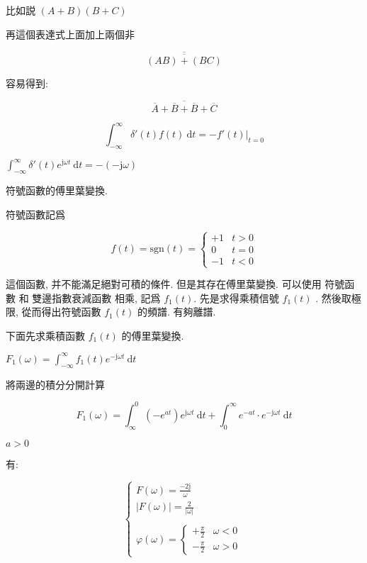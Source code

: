 \documentclass[a4paper, 10pt]{ctexbook} %
\begin{document}
比如説 $\left(A + B\right) \left(B +C\right)$

再這個表達式上面加上兩個非

$$ \overline{ \overline { \left(A  B \right) +\left( B  C\right)}}$$

容易得到: 

$$ \overline{ \overline{A}+  \overline{B} + \overline{B} + \overline{C}}$$

$$ \int  ^{\infty} _{-\infty} \delta ' \left(t\right) f(t) \ \mathrm{d}t   = - \left. f'\left(t\right) \right| _{t=0}$$

$\int ^{\infty} _{-\infty} \delta ' \left(t\right) e ^{\mathrm{j} \omega t }\ \mathrm{d}t = - \left( - \mathrm{j} \omega\right)$



符號函數的傅里葉變換. 

符號函數記爲 

$$f\left(t\right)  = \mathrm{sgn} \left(t\right) = \begin{cases} +1 & t > 0 \\ 0 & t= 0 \\ -1 & t<0 \end{cases} $$

這個函數, 并不能滿足絕對可積的條件. 但是其存在傅里葉變換. 可以使用 符號函數 和 雙邊指數衰減函數 相乘, 記爲 $f_{1} \left(t\right)$. 先是求得乘積信號 $f_1\left(t\right)$ . 然後取極限, 從而得出符號函數 $f_1 \left(t\right)$ 的頻譜. 有夠離譜. 

下面先求乘積函數 $f_{1} \left(t\right)$ 的傅里葉變換. 

$F_{1} \left(\omega\right) = \int ^{\infty}_{-\infty} f_{1} \left(t\right) e ^{-\mathrm{j} \omega t}\ \mathrm{d}t$

將兩邊的積分分開計算

$$F_1 \left(\omega\right) = \int ^{0} _{\infty} \left(-e^{at}\right) e ^{\mathrm{j} \omega   t   }\ \mathrm{d}t + \int ^{\infty}_{0} e ^{-at} \cdot  e ^{-\mathrm{j} \omega t}\ \mathrm{d}t$$

$a> 0$

有: 

$$ \begin{cases} \displaystyle  F \left(\omega\right) = \frac{ -2 \mathrm{j} }{\omega } \\ \displaystyle \left| F \left(\omega\right) \right|  = \frac{ 2 }{|\omega|}\\ \\ \displaystyle  \varphi  \left( \omega\right) = \begin{cases} \displaystyle + \frac{\pi}{2}  & \omega < 0 \\ \displaystyle  - \frac{\pi}{2} & \omega > 0 \end{cases} \end{cases} $$
\end{document}
